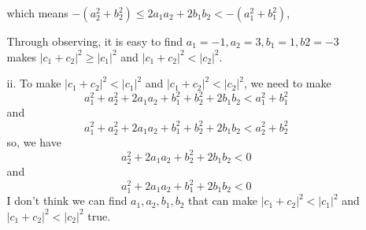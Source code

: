 \documentclass{article}
\begin{document}
\begin{enumerate}
\begin{enumerate}
        which means $-(a_2^2+b_2^2)\leq 2a_1a_2+2b_1b_2<-(a_1^2+b_1^2)$,
        
        Through observing, it is easy to find $a_1=-1,a_2=3,b_1=1,b2=-3$ makes $|c_1+c_2|^2\geq |c_1|^2$ and $|c_1+c_2|^2< |c_2|^2$.
        
        \item[ii.] To make $|c_1+c_2|^2< |c_1|^2$ and $|c_1+c_2|^2< |c_2|^2$,
        we need to make
        \[a_1^2+a_2^2+2a_1a_2+b_1^2+b_2^2+2b_1b_2< a_1^2+b_1^2\]
        and
        \[a_1^2+a_2^2+2a_1a_2+b_1^2+b_2^2+2b_1b_2< a_2^2+b_2^2\]
        so, we have
        \[a_2^2+2a_1a_2+b_2^2+2b_1b_2< 0\]
        and
        \[a_1^2+2a_1a_2+b_1^2+2b_1b_2< 0\]
        I don't think we can find $a_1,a_2,b_1,b_2$ that can make $|c_1+c_2|^2< |c_1|^2$ and $|c_1+c_2|^2< |c_2|^2$ true.

    \end{enumerate}
\end{enumerate}
\end{document}
